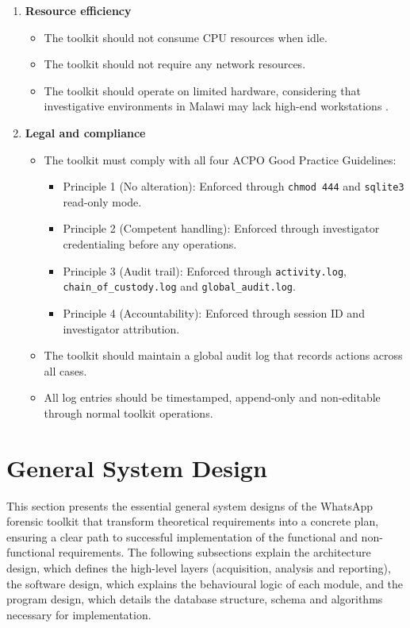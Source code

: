 \documentclass[12pt,a4paper]{report}
\begin{document}
\begin{enumerate}
    \item \textbf{Resource efficiency}
    \begin{itemize}
        \item The toolkit should not consume CPU resources when idle.
        \item The toolkit should not require any network resources.
        \item The toolkit should operate on limited hardware, considering that investigative environments in Malawi may lack high-end workstations \citep{chimoyo2024}.
    \end{itemize}

    \item \textbf{Legal and compliance}
    \begin{itemize}
        \item The toolkit must comply with all four ACPO Good Practice Guidelines:
        \begin{itemize}
            \item Principle 1 (No alteration): Enforced through \texttt{chmod 444} and \texttt{sqlite3} read-only mode.
            \item Principle 2 (Competent handling): Enforced through investigator credentialing before any operations.
            \item Principle 3 (Audit trail): Enforced through \texttt{activity.log}, \texttt{chain\_of\_custody.log} and \texttt{global\_audit.log}.
            \item Principle 4 (Accountability): Enforced through session ID and investigator attribution.
        \end{itemize}
        \item The toolkit should maintain a global audit log that records actions across all cases.
        \item All log entries should be timestamped, append-only and non-editable through normal toolkit operations.
    \end{itemize}
\end{enumerate}

\section{General System Design}

This section presents the essential general system designs of the WhatsApp forensic toolkit that transform theoretical requirements into a concrete plan, ensuring a clear path to successful implementation of the functional and non-functional requirements. The following subsections explain the architecture design, which defines the high-level layers (acquisition, analysis and reporting), the software design, which explains the behavioural logic of each module, and the program design, which details the database structure, schema and algorithms necessary for implementation.
\end{document}

